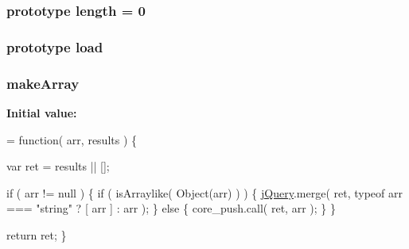 \subsubsection[{length}]{ {\bf prototype} length = 0}\label{jquery-1_810_82-vsdoc_8js_aa7de35d58da66d9944ab9cbe82c19640}
\hypertarget{jquery-1_810_82-vsdoc_8js_aac1755fc9b2cc2faff075499e65f6d83}{}
\subsubsection[{load}]{ {\bf prototype} load}\label{jquery-1_810_82-vsdoc_8js_aac1755fc9b2cc2faff075499e65f6d83}
\hypertarget{jquery-1_810_82-vsdoc_8js_aeb415829cbd66d6538dadc5de9adc5ab}{}
\subsubsection[{make\+Array}]{ make\+Array}\label{jquery-1_810_82-vsdoc_8js_aeb415829cbd66d6538dadc5de9adc5ab}
{\bfseries Initial value\+:}
\begin{DoxyCode}
= \textcolor{keyword}{function}( arr, results ) \{


        var ret = results || [];

        \textcolor{keywordflow}{if} ( arr != null ) \{
            \textcolor{keywordflow}{if} ( isArraylike( Object(arr) ) ) \{
                \hyperlink{jquery-1_810_82-vsdoc_8js_add5237586d970a38a81f990e8eb28c6c}{jQuery}.merge( ret,
                    typeof arr === \textcolor{stringliteral}{"string"} ?
                    [ arr ] : arr
                );
            \} \textcolor{keywordflow}{else} \{
                core\_push.call( ret, arr );
            \}
        \}

        \textcolor{keywordflow}{return} ret;
    \}
\end{DoxyCode}
\hypertarget{jquery-1_810_82-vsdoc_8js_a20838f8c4bedc779e51bf830f5a4d471}{}
